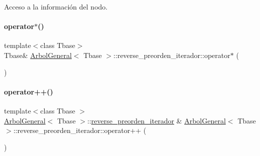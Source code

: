 Acceso a la información del nodo. 

\hypertarget{classArbolGeneral_1_1reverse__preorden__iterador_a159fd764b91fefacaece5c8c4cbb66fb}{}\label{classArbolGeneral_1_1reverse__preorden__iterador_a159fd764b91fefacaece5c8c4cbb66fb} 
\paragraph{\texorpdfstring{operator$\ast$()}{operator*()}\hspace{0.1cm}{\footnotesize\ttfamily [2/2]}}
{\footnotesize\ttfamily template$<$class Tbase$>$ \\
Tbase\& \hyperlink{classArbolGeneral}{Arbol\+General}$<$ Tbase $>$\+::reverse\+\_\+preorden\+\_\+iterador\+::operator$\ast$ (\begin{DoxyParamCaption}{ }\end{DoxyParamCaption})\hspace{0.3cm}{\ttfamily [inline]}}

\hypertarget{classArbolGeneral_1_1reverse__preorden__iterador_a46a546c134ae2d7fe7bc41e16227eb1f}{}\label{classArbolGeneral_1_1reverse__preorden__iterador_a46a546c134ae2d7fe7bc41e16227eb1f} 
\paragraph{\texorpdfstring{operator++()}{operator++()}}
{\footnotesize\ttfamily template$<$class Tbase $>$ \\
\hyperlink{classArbolGeneral}{Arbol\+General}$<$ Tbase $>$\+::\hyperlink{classArbolGeneral_1_1reverse__preorden__iterador}{reverse\+\_\+preorden\+\_\+iterador} \& \hyperlink{classArbolGeneral}{Arbol\+General}$<$ Tbase $>$\+::reverse\+\_\+preorden\+\_\+iterador\+::operator++ (\begin{DoxyParamCaption}{ }\end{DoxyParamCaption})}



